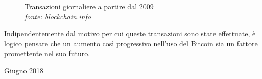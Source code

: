 \documentclass {article}
\begin{document}
\vspace {0.5cm}
\begin{figure}[htb!]
\caption {Transazioni giornaliere a partire dal 2009\\\textit{fonte: blockchain.info}}
\end{figure}
\vspace {0.2cm}
\noindent
%
Indipendentemente dal motivo per cui queste transazioni sono state effettuate, è logico pensare che un aumento così progressivo nell'uso del Bitcoin sia un fattore promettente nel suo futuro.


\newpage

\printbibliography

\newpage



\centering
\vspace*{1cm}
\vfill
\Huge{Giugno 2018}
\vspace{1cm}
\vfill
\end{document}
